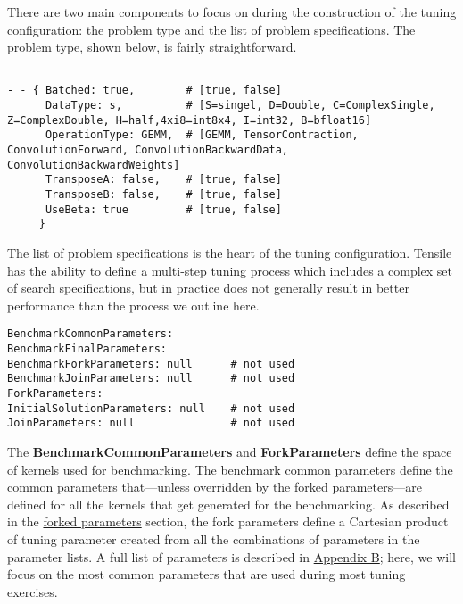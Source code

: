 \documentclass[]{article}
\begin{document}
There are two main components to focus on during the construction of the tuning configuration: the problem type and the list of problem specifications. The problem type, shown below, is fairly straightforward.

\begin{verbatim}

- - { Batched: true,        # [true, false]
      DataType: s,          # [S=singel, D=Double, C=ComplexSingle, Z=ComplexDouble, H=half,4xi8=int8x4, I=int32, B=bfloat16]
      OperationType: GEMM,  # [GEMM, TensorContraction, ConvolutionForward, ConvolutionBackwardData, ConvolutionBackwardWeights]
      TransposeA: false,    # [true, false]
      TransposeB: false,    # [true, false]
      UseBeta: true         # [true, false]
     }

\end{verbatim}

The list of problem specifications is the heart of the tuning configuration. Tensile has the ability to define a multi-step tuning process which includes a complex set of search specifications, but in practice does not generally result in better performance than the process we outline here.
\begin{verbatim}
BenchmarkCommonParameters:
BenchmarkFinalParameters:
BenchmarkForkParameters: null      # not used
BenchmarkJoinParameters: null      # not used
ForkParameters:
InitialSolutionParameters: null    # not used
JoinParameters: null               # not used
\end{verbatim}

The  {\color{ForestGreen} \bf BenchmarkCommonParameters} and  {\color{ForestGreen} \bf ForkParameters} define the space of kernels used for benchmarking. The benchmark common parameters define the common parameters that---unless overridden by the forked parameters---are defined for all the kernels that get generated for the benchmarking. As described in the \hyperref[sec:forkParams]{forked parameters} section, the fork parameters define a Cartesian product of tuning parameter created from all the combinations of parameters in the parameter lists. A full list of parameters is described in \hyperref[sec:appendixB]{Appendix B}; here, we will focus on the most common parameters that are used during most tuning exercises.
\end{document}
